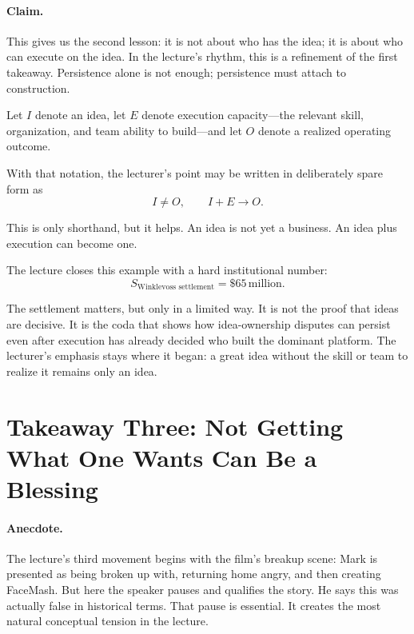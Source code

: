 \paragraph{Claim.}
This gives us the second lesson: it is not about who has the idea; it is about who can execute on the idea. In the lecture's rhythm, this is a refinement of the first takeaway. Persistence alone is not enough; persistence must attach to construction.

\begin{definition}
Let \(I\) denote an idea, let \(E\) denote execution capacity---the relevant skill, organization, and team ability to build---and let \(O\) denote a realized operating outcome.
\end{definition}

With that notation, the lecturer's point may be written in deliberately spare form as
\begin{equation}
I \neq O,
\qquad
I + E \longrightarrow O.
\end{equation}

This is only shorthand, but it helps. An idea is not yet a business. An idea plus execution can become one.

The lecture closes this example with a hard institutional number:
\begin{equation}
S_{\text{Winklevoss settlement}} = \$65\,\text{million}.
\end{equation}

The settlement matters, but only in a limited way. It is not the proof that ideas are decisive. It is the coda that shows how idea-ownership disputes can persist even after execution has already decided who built the dominant platform. The lecturer's emphasis stays where it began: a great idea without the skill or team to realize it remains only an idea.

\section{Takeaway Three: Not Getting What One Wants Can Be a Blessing}

\paragraph{Anecdote.}
The lecture's third movement begins with the film's breakup scene: Mark is presented as being broken up with, returning home angry, and then creating FaceMash. But here the speaker pauses and qualifies the story. He says this was actually false in historical terms. That pause is essential. It creates the most natural conceptual tension in the lecture.

